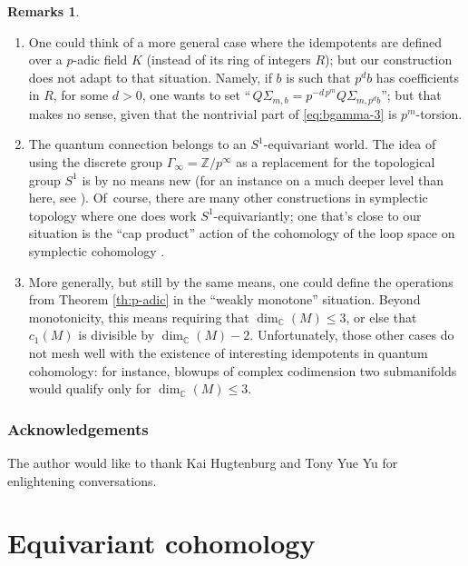 \documentclass[JEP,XML,SOM,Unicode,NoFloatCountersInSection,published]{cedram}
\theoremstyle{plain}
\theoremstyle{definition}
\newtheorem{remarks}[theorem]{Remarks}
\newcommand{\bC}{{\mathbb C}}
\newcommand{\bZ}{{\mathbb Z}}
\begin{document}
\skpt
\begin{remarks}
\begin{enumerate}
\item
One could think of a more general case where the idempotents are defined over a $p$-adic field $K$ (instead of its ring of integers $R$); but our construction does not adapt to that situation. Namely, if $b$ is such that $p^d b$ has coefficients in $R$, for some $d>0$, one wants to set ``\,$Q\Sigma_{m,b} = p^{-d \, p^m} Q\Sigma_{m,p^d b}$''; but that makes no sense, given that the nontrivial part of \eqref{eq:bgamma-3} is $p^m$-torsion.

\item
The quantum connection belongs to an $S^1$-equivariant world. The idea of using the discrete group $\Gamma_\infty = \bZ/p^\infty$ as a replacement for the topological group $S^1$ is by no means new (for an instance on a much deeper level than here, see \cite[\S II.1]{nikolaus-scholze18}). Of~course, there are many other constructions in symplectic topology where one does work $S^1$-equivariantly; one that's close to our situation is the ``cap product'' action of the cohomology of the loop space on symplectic cohomology \cite{viterbo95, viterbo97a}.

\item
More generally, but still by the same means, one could define the operations from Theorem \ref{th:p-adic} in the ``weakly monotone'' situation. Beyond monotonicity, this means requiring that $\dim_{\bC}(M) \leq 3$, or else that $c_1(M)$ is divisible by $\dim_{\bC}(M)-2$. Unfortunately, those other cases do not mesh well with the existence of interesting idempotents in quantum cohomology: for instance, blowups of complex codimension two submanifolds would qualify only for $\dim_{\bC}(M) \leq 3$.
\end{enumerate}
\end{remarks}

\subsubsection*{Acknowledgements}
The author would like to thank Kai Hugtenburg and Tony Yue Yu for enlightening conversations.

\section{Equivariant cohomology}
\end{document}

